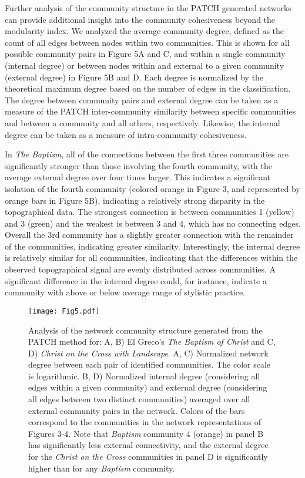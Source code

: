 \documentclass[11pt]{article}
\begin{document}
Further analysis of the community structure in the PATCH generated
networks can provide additional insight into the community cohesiveness
beyond the modularity index. We analyzed the average community degree,
defined as the count of all edges between nodes within two communities.
This is shown for all possible community pairs in Figure 5A and C, and
within a single community (internal degree) or between nodes within and
external to a given community (external degree) in Figure 5B and D. Each
degree is normalized by the theoretical maximum degree based on the
number of edges in the classification. The degree between community
pairs and external degree can be taken as a measure of the PATCH
inter-community similarity between specific communities and between a
community and all others, respectively. Likewise, the internal degree
can be taken as a measure of intra-community cohesiveness.

In \emph{The Baptism}, all of the connections between the first three
communities are significantly stronger than those involving the fourth
community, with the average external degree over four times larger. This
indicates a significant isolation of the fourth community (colored orange in Figure 3, and represented by orange bars in Figure 5B), indicating a relatively strong disparity in the topographical data. The strongest connection is between communities 1 (yellow) and 3 (green) and the weakest is between 3
and 4, which has no connecting edges. Overall the 3rd community has a
slightly greater connection with the remainder of the communities,
indicating greater similarity. Interestingly, the internal degree is
relatively similar for all communities, indicating that the differences
within the observed topographical signal are evenly distributed across
communities. A significant difference in the internal degree could, for
instance, indicate a community with above or below average range of
stylistic practice.

\begin{figure}
\texttt{[image: Fig5.pdf]}
\caption{Analysis of the network community structure generated
from the PATCH method for: A, B) El Greco's \emph{The Baptism of Christ}
and C, D) \emph{Christ on the Cross with Landscape}. A, C) Normalized
network degree between each pair of identified communities. The color
scale is logarithmic. B, D) Normalized internal degree (considering all
edges within a given community) and external degree (considering all
edges between two distinct communities) averaged over all external
community pairs in the network. Colors of the bars correspond to the communities in
the network representations of Figures 3-4. Note that \emph{Baptism} community 4 (orange) in panel B has
significantly less external connectivity, and the external degree for
the \emph{Christ on the Cross} communities in panel D is significantly higher than for any \emph{Baptism} community.}
\end{figure}
\end{document}
